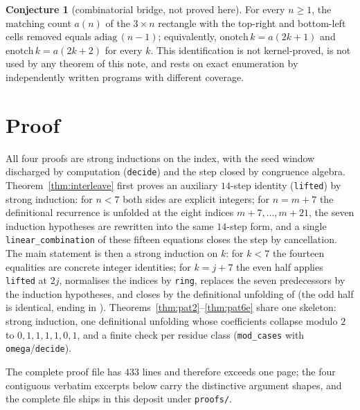 \documentclass[11pt]{article}
\theoremstyle{definition}
\newtheorem{conjecture}{Conjecture}
\begin{document}
\begin{conjecture}[combinatorial bridge, not proved here]\label{conj:bridge}
For every $n\ge 1$, the matching count $a(n)$ of the $3\times n$ rectangle with
the top-right and bottom-left cells removed equals
$\mathrm{adiag}\,(n-1)$; equivalently, $\mathrm{onotch}\,k=a(2k+1)$ and
$\mathrm{enotch}\,k=a(2k+2)$ for every $k$. This identification is not
kernel-proved, is not used by any theorem of this note, and rests on exact
enumeration by independently written programs with different coverage.
\end{conjecture}

\section{Proof}\label{sec:proof}

All four proofs are strong inductions on the index, with the seed window
discharged by computation (\texttt{decide}) and the step closed by congruence
algebra. Theorem~\ref{thm:interleave} first proves an auxiliary $14$-step
identity (\texttt{lifted}) by strong induction: for $n<7$ both sides are
explicit integers; for $n=m+7$ the definitional recurrence is unfolded at the
eight indices $m+7,\dots,m+21$, the seven induction hypotheses are rewritten
into the same $14$-step form, and a single \texttt{linear\_combination} of
these fifteen equations closes the step by cancellation. The main statement is
then a strong induction on $k$: for $k<7$ the fourteen equalities are concrete
integer identities; for $k=j+7$ the even half applies \texttt{lifted} at $2j$,
normalises the indices by \texttt{ring}, replaces the seven predecessors by the
induction hypotheses, and closes by the definitional unfolding of
 (the odd half is identical, ending in ).
Theorems~\ref{thm:pat2}--\ref{thm:pat6e} share one skeleton: strong induction,
one definitional unfolding whose coefficients collapse modulo $2$ to
$0,1,1,1,1,0,1$, and a finite check per residue class
(\texttt{mod\_cases} with \texttt{omega}/\texttt{decide}).

The complete proof file has $433$ lines and therefore exceeds one page; the
four contiguous verbatim excerpts below carry the distinctive argument shapes,
and the complete file ships in this deposit under \texttt{proofs/}.
\end{document}
